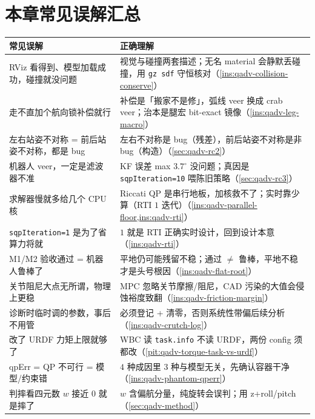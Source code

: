 \section*{本章常见误解汇总}

\begin{table}[H]\centering\small
\begin{tabular}{p{} p{}}
\toprule
\textbf{常见误解} & \textbf{正确理解} \\
\midrule
RViz 看得到、模型加载成功，碰撞就没问题 & 视觉与碰撞两套描述；无名 material 会静默丢碰撞，用 \texttt{gz sdf} 守恒核对（\cref{ins:qadv-collision-conserve}）\\
走不直加个航向锁补偿就行 & 补偿是「搬家不是修」，弧线 veer 换成 crab veer；治本是腿宏 bit-exact 镜像（\cref{ins:qadv-leg-macro}）\\
左右站姿不对称 = 前后站姿不对称，都是 bug & 左右不对称是 bug（残差），前后站姿不对称是非 bug（构造）（\cref{sec:qadv-rc2}）\\
机器人 veer，一定是滤波器不准 & KF 误差 max $3.7^\circ$ 没问题；真因是 \texttt{sqpIteration=10} 喂陈旧策略（\cref{sec:qadv-rc3}）\\
求解器慢就多给几个 CPU 核 & Riccati QP 是串行地板，加核救不了；实时靠少算（RTI $1$ 迭代）（\cref{ins:qadv-parallel-floor,ins:qadv-rti}）\\
\texttt{sqpIteration=1} 是为了省算力将就 & $1$ 就是 RTI 正确实时设计，回到设计本意（\cref{ins:qadv-rti}）\\
M1/M2 验收通过 = 机器人鲁棒了 & 平地仍可能残留不稳；通过 $\neq$ 鲁棒，平地不稳才是头号根因（\cref{ins:qadv-flat-root}）\\
关节阻尼大点无所谓，物理上更稳 & MPC 忽略关节摩擦/阻尼，CAD 污染的大值会侵蚀裕度致翻（\cref{ins:qadv-friction-margin}）\\
诊断时临时调的参数，事后不用管 & 必须登记 + 清零，否则系统性带偏后续分析（\cref{ins:qadv-crutch-log}）\\
改了 URDF 力矩上限就够了 & WBC 读 \texttt{task.info} 不读 URDF，两份 config 须都改（\cref{pit:qadv-torque-task-vs-urdf}）\\
qpErr = QP 不可行 = 模型/约束错 & $4$ 种成因里 $3$ 种与模型无关，先确认容器干净（\cref{ins:qadv-phantom-qperr}）\\
判摔看四元数 $w$ 接近 $0$ 就是摔了 & $w$ 含偏航分量，纯旋转会误判；用 z+roll/pitch（\cref{sec:qadv-method}）\\
\bottomrule
\end{tabular}
\end{table}

